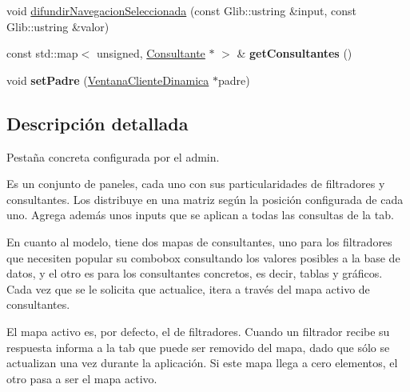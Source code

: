 \begin{DoxyCompactItemize}
\item 
void \hyperlink{classTab_a16a4ce877365b06b134e5c319eab5a28}{difundir\-Navegacion\-Seleccionada} (const \-Glib\-::ustring \&input, const \-Glib\-::ustring \&valor)
\item 
\hypertarget{classTab_a9b1f4c54ef6d163fbc2bf832fd835aaa}{const std\-::map$<$ unsigned, \*
\hyperlink{classConsultante}{\-Consultante} $\ast$ $>$ \& {\bfseries get\-Consultantes} ()}\label{classTab_a9b1f4c54ef6d163fbc2bf832fd835aaa}

\item 
\hypertarget{classTab_a3522dbefc715bfaebd922ef5542736a5}{void {\bfseries set\-Padre} (\hyperlink{classVentanaClienteDinamica}{\-Ventana\-Cliente\-Dinamica} $\ast$padre)}\label{classTab_a3522dbefc715bfaebd922ef5542736a5}

\end{DoxyCompactItemize}


\subsection{\-Descripción detallada}
\-Pestaña concreta configurada por el admin.

\-Es un conjunto de paneles, cada uno con sus particularidades de filtradores y consultantes. \-Los distribuye en una matriz según la posición configurada de cada uno. \-Agrega además unos inputs que se aplican a todas las consultas de la tab.

\-En cuanto al modelo, tiene dos mapas de consultantes, uno para los filtradores que necesiten popular su combobox consultando los valores posibles a la base de datos, y el otro es para los consultantes concretos, es decir, tablas y gráficos. \-Cada vez que se le solicita que actualice, itera a través del mapa activo de consultantes.

\-El mapa activo es, por defecto, el de filtradores. \-Cuando un filtrador recibe su respuesta informa a la tab que puede ser removido del mapa, dado que sólo se actualizan una vez durante la aplicación. \-Si este mapa llega a cero elementos, el otro pasa a ser el mapa activo. 

